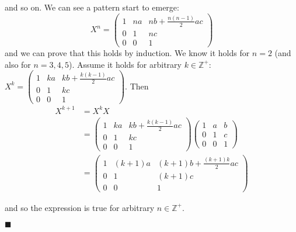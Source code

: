 \documentclass[12pt]{article}
\renewcommand{\qed}{\hfill$\blacksquare$}
\renewenvironment{proof}{\begin{addmargin}[1em]{0em}\begin{newproof}}{\end{newproof}\end{addmargin}\qed}
\begin{document}
\begin{proof}
\begin{itemize}
    and so on. We can see a pattern start to emerge:
    $$ X^n = \left(\begin{array}{ccc} 1 & na & nb+ \frac{n\left(n-1\right)}{2}ac \\ 0 & 1 & nc \\ 0 & 0 & 1 \end{array}\right) $$ and we can prove that this holds by induction. We know it holds for $n=2$ (and also for $n=3,4,5$). Assume it holds for arbitrary $k\in \mathbb{Z}^+$: $X^k= \left(\begin{array}{ccc} 1 & ka & kb+ \frac{k\left(k-1\right)}{2}ac \\ 0 & 1 & kc \\ 0 & 0 & 1 \end{array}\right)$. Then
    \begin{equation*}\begin{split} X^{k+1} & = X^kX \\ & =\left(\begin{array}{ccc} 1 & ka & kb+\frac{k\left(k-1\right)}{2}ac \\ 0 & 1 & kc \\ 0 & 0 & 1 \end{array}\right)\left(\begin{array}{ccc} 1 & a & b \\ 0 & 1 & c \\ 0 & 0 & 1 \end{array}\right) \\ & = \left(\begin{array}{ccc} 1 & \left(k+1\right)a & \left(k+1\right)b+\frac{\left(k+1\right)k}{2}ac  \\ 0 & 1 & \left(k+1\right)c  \\ 0 & 0 & 1 \end{array}\right)
    \end{split}\end{equation*}
\end{itemize}
and so the expression is true for arbitrary $n\in \mathbb{Z}^+$.


\end{proof}
\end{document}
